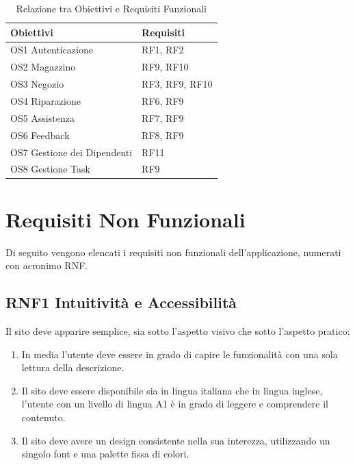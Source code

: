 \documentclass{report}
\begin{document}
\begin{table}[h]
\begin{center} %
	\centering
	\begin{tabular}{ |p{4cm}|p{4cm}|  }
		\hline
		\centering Obiettivi & \qquad\qquad Requisiti \\ %
		\hline
		OS1 Autenticazione & RF1, RF2 \\
		\hline
		OS2 Magazzino & RF9, RF10 \\
		\hline
		OS3 Negozio &
		RF3, RF9, RF10 \\
		\hline
		OS4 Riparazione & RF6, RF9\\
		\hline
		OS5 Assistenza & RF7, RF9 \\
		\hline
		OS6 Feedback & RF8, RF9 \\
		\hline
		OS7 Gestione dei Dipendenti & RF11 \\
		\hline
		OS8 Gestione Task & RF9 \\
		\hline
	\end{tabular}
\caption{Relazione tra Obiettivi e Requisiti Funzionali}
\end{center}
\end{table}


\section{Requisiti Non Funzionali}
Di seguito vengono elencati i requisiti non funzionali dell’applicazione, numerati con acronimo RNF.

\subsection*{RNF1 Intuitività e Accessibilità}
Il sito deve apparire semplice, sia sotto l'aspetto visivo che sotto l'aspetto pratico:
\begin{enumerate}
	\item In media l’utente deve essere in grado di capire le funzionalità con una sola lettura della descrizione.
	\item Il sito deve essere disponibile sia in lingua italiana che in lingua inglese, l’utente con un livello di lingua A1 è in grado di leggere e comprendere il contenuto.
	\item Il sito deve avere un design consistente nella sua interezza, utilizzando un singolo font e una palette fissa di colori.
\end{enumerate}
\end{document}
